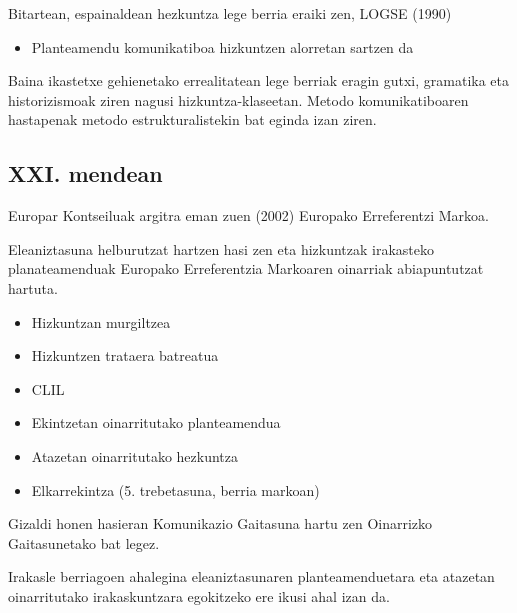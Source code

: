 \documentclass[
]{book}
\providecommand{\tightlist}{%
  \setlength{\itemsep}{0pt}\setlength{\parskip}{0pt}}
\begin{document}
Bitartean, espainaldean hezkuntza lege berria eraiki zen, LOGSE (1990)

\begin{itemize}
\tightlist
\item
  Planteamendu komunikatiboa hizkuntzen alorretan sartzen da
\end{itemize}

Baina ikastetxe gehienetako errealitatean lege berriak eragin gutxi, gramatika eta historizismoak ziren nagusi hizkuntza-klaseetan. Metodo komunikatiboaren hastapenak metodo estrukturalistekin bat eginda izan ziren.

\hypertarget{xxi.-mendean}{%
\subsection{XXI. mendean}\label{xxi.-mendean}}

Europar Kontseiluak argitra eman zuen (2002) Europako Erreferentzi Markoa.

Eleaniztasuna helburutzat hartzen hasi zen eta hizkuntzak irakasteko planateamenduak Europako Erreferentzia Markoaren oinarriak abiapuntutzat hartuta.

\begin{itemize}
\tightlist
\item
  Hizkuntzan murgiltzea
\item
  Hizkuntzen trataera batreatua
\item
  CLIL
\item
  Ekintzetan oinarritutako planteamendua
\item
  Atazetan oinarritutako hezkuntza
\item
  Elkarrekintza (5. trebetasuna, berria markoan)
\end{itemize}

Gizaldi honen hasieran Komunikazio Gaitasuna hartu zen Oinarrizko Gaitasunetako bat legez.

Irakasle berriagoen ahalegina eleaniztasunaren planteamenduetara eta atazetan oinarritutako irakaskuntzara egokitzeko ere ikusi ahal izan da.
\end{document}
